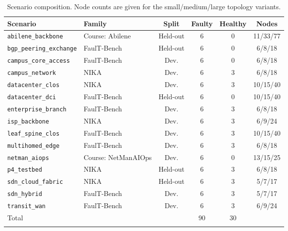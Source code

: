 \documentclass[pdflatex,sn-basic,Numbered,iicol]{sn-jnl}
\begin{document}
\begin{appendices}
\begin{table}[h]
\caption{Scenario composition. Node counts are given for the small/medium/large topology variants.}\label{tab:scen}
\footnotesize
\begin{tabular}{@{}llcccc@{}}
\toprule
Scenario & Family & Split & Faulty & Healthy & Nodes \\
\midrule
\texttt{abilene\_backbone} & Course: Abilene & Held-out & 6 & 0 & 11/33/77 \\
\texttt{bgp\_peering\_exchange} & FaulT-Bench & Held-out & 6 & 0 & 6/8/18 \\
\texttt{campus\_core\_access} & FaulT-Bench & Dev. & 6 & 0 & 6/8/18 \\
\texttt{campus\_network} & NIKA & Dev. & 6 & 3 & 6/8/18 \\
\texttt{datacenter\_clos} & NIKA & Dev. & 6 & 3 & 10/15/40 \\
\texttt{datacenter\_dci} & FaulT-Bench & Held-out & 6 & 0 & 10/15/40 \\
\texttt{enterprise\_branch} & FaulT-Bench & Dev. & 6 & 3 & 6/8/18 \\
\texttt{isp\_backbone} & NIKA & Dev. & 6 & 3 & 6/9/24 \\
\texttt{leaf\_spine\_clos} & FaulT-Bench & Dev. & 6 & 3 & 10/15/40 \\
\texttt{multihomed\_edge} & FaulT-Bench & Dev. & 6 & 3 & 6/8/18 \\
\texttt{netman\_aiops} & Course: NetManAIOps & Dev. & 6 & 0 & 13/15/25 \\
\texttt{p4\_testbed} & NIKA & Held-out & 6 & 3 & 6/8/18 \\
\texttt{sdn\_cloud\_fabric} & NIKA & Held-out & 6 & 3 & 5/7/17 \\
\texttt{sdn\_hybrid} & FaulT-Bench & Dev. & 6 & 3 & 5/7/17 \\
\texttt{transit\_wan} & FaulT-Bench & Dev. & 6 & 3 & 6/9/24 \\
\midrule
Total & & & 90 & 30 & \\
\botrule
\end{tabular}
\end{table}


\end{appendices}
\end{document}
